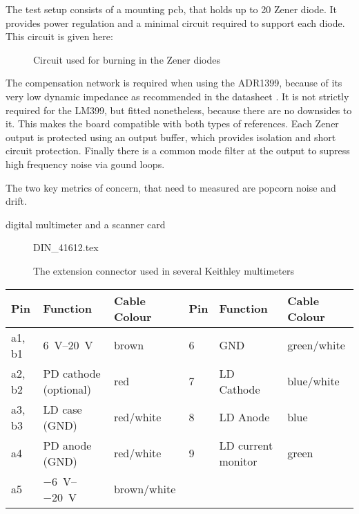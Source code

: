 The test setup consists of a mounting pcb, that holds up to 20 Zener diode. It provides power regulation and a minimal circuit required to support each diode. This circuit is given here:

\begin{figure}[ht]
    \centering
    \caption{Circuit used for burning in the Zener diodes}
\end{figure}

The compensation network is required when using the ADR1399, because of its very low dynamic impedance as recommended in the datasheet \cite{datasheet_ADR1399}. It is not strictly required for the LM399, but fitted nonetheless, because there are no downsides to it. This makes the board compatible with both types of references. Each Zener output is protected using an output buffer, which provides isolation and short circuit protection. Finally there is a common mode filter at the output to supress high frequency noise via gound loops.

The two key metrics of concern, that need to measured are popcorn noise and drift.

digital multimeter and a scanner card


\begin{figure}[ht]
    \centering
    {DIN_41612.tex}
    \caption{The extension connector used in several Keithley multimeters}
\end{figure}

\begin{tabular}{llllll}
    \toprule
    Pin    & Function    & Cable Colour    & Pin    & Function    &  Cable Colour\\
    \midrule
    a1, b1    & \SIrange[explicit-sign=+]{6}{20}{\volt}    & brown    & \num{6}    & GND    & green/white\\
    a2, b2    & PD cathode (optional)    & red    & \num{7}    & LD Cathode    & blue/white\\
    a3, b3    & LD case (GND)    & red/white    & \num{8}    & LD Anode    & blue\\
    a4    & PD anode (GND)    & red/white    & \num{9}    & LD current monitor    & green\\
    a5    & \SIrange{-6}{-20}{\volt}    & brown/white\\
    \bottomrule
\end{tabular}

